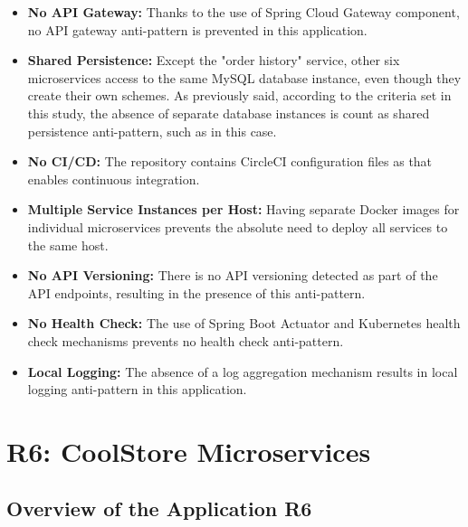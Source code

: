 \documentclass{Configuration_Files/PoliMi3i_thesis}
\begin{document}
\begin{itemize}
    \item \textbf{No API Gateway:} Thanks to the use of Spring Cloud Gateway component, no API gateway anti-pattern is prevented in this application.
    
    \item \textbf{Shared Persistence:} Except the "order history" service, other six microservices access to the same MySQL database instance, even though they create their own schemes.
    As previously said, according to the criteria set in this study, the absence of separate database instances is count as shared persistence anti-pattern, such as in this case.
    
    \item \textbf{No CI/CD:} The repository contains CircleCI\footnotemark[94] configuration files as that enables continuous integration.
    
    \item \textbf{Multiple Service Instances per Host:} Having separate Docker images for individual microservices prevents the absolute need to deploy all services to the same host.
    
    \item \textbf{No API Versioning:} There is no API versioning detected as part of the API endpoints, resulting in the presence of this anti-pattern.
    
    \item \textbf{No Health Check:} The use of Spring Boot Actuator and Kubernetes health check mechanisms prevents no health check anti-pattern.
    
    \item \textbf{Local Logging:} The absence of a log aggregation mechanism results in local logging anti-pattern in this application.
\end{itemize}

\section{R6: CoolStore Microservices}
\label{sec:R6}

\subsection{Overview of the Application R6}
\label{subsec:R6_overview}
\end{document}
